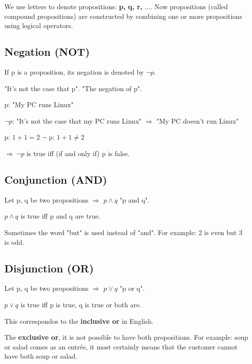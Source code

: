\documentclass[12pt, a4paper]{book}
\begin{document}
We use letters to denote propositions: \textbf{p, q, r, }$\ldots$. Now propositions (called compound propositions) are
constructed by combining one or more propositions using logical operators.

\subsection*{Negation (NOT)}
If p is a proposition, its negation is denoted by $\lnot p$. 

"It's not the case that p". "The negation of p".

\begin{exmp}
    p: "My PC runs Linux"

    $\lnot p$: "It's not the case that my PC runs Linux" $\Rightarrow$ "My PC doesn't run Linux"
\end{exmp}

\begin{exmp}
    p: $1+1=2$
    $\lnot$ p: $1+1 \neq 2$

    $\Rightarrow \ \lnot p$ is true iff (if and only if) p is false.
\end{exmp}

\subsection*{Conjunction (AND)}

Let p, q be two propositions $\Rightarrow$ $p \wedge q$ "p and q".

$p \wedge q$ is true iff p and q are true.


\begin{rem}
    Sometimes the word "but" is used instead of "and". For example: 2 is even but 3 is odd.
\end{rem}

\subsection*{Disjunction (OR)}

Let p, q be two propositions $\Rightarrow$ $p \vee q$ "p or q".

$p \vee q$ is true iff p is true, q is true or both are.

This correspondos to the \textbf{inclusive or} in English.

\begin{rem}
    The \textbf{exclusive or}, it is not possible to have both propositions. For example: soup or salad comes as an entrée, it most certainly
    means that the customer cannot have both soup or salad.
\end{rem}
\end{document}
